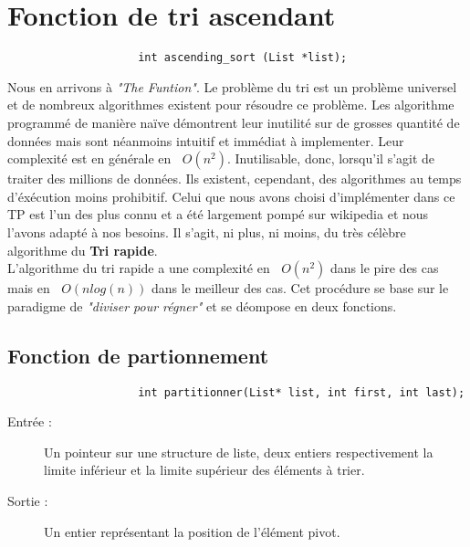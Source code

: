 \documentclass[a4paper, 12pt, leqno]{report}
\theoremstyle{plain}
\newcommand{\bigO}[1]{\ensuremath{\mathop{}\mathopen{}O\mathopen{}\left(#1\right)}}
\begin{document}
        \section{Fonction de tri ascendant}
                        \begin{verbatim}
                    int ascending_sort (List *list);
                \end{verbatim}
            Nous en arrivons à \textit{"The Funtion"}. Le problème du tri est un problème universel et de nombreux algorithmes existent pour résoudre ce problème. Les algorithme programmé de manière naïve démontrent leur inutilité sur de grosses quantité de données mais sont néanmoins intuitif et immédiat à implementer. Leur complexité est en générale en $\bigO{n^2}$. Inutilisable, donc, lorsqu'il s'agit de traiter des millions de données. Ils existent, cependant, des algorithmes au temps d'éxécution moins prohibitif. Celui que nous avons choisi d'implémenter dans ce TP est l'un des plus connu et a été largement pompé sur wikipedia et nous l'avons adapté à nos besoins. Il s'agit, ni plus, ni moins, du très célèbre algorithme du \textbf{Tri rapide}.\\
            
            L'algorithme du tri rapide a une complexité en $\bigO{n^2}$ dans le pire des cas mais en $\bigO{nlog(n)}$ dans le meilleur des cas. Cet procédure se base sur le paradigme de \textit{"diviser pour régner"} et se déompose en deux fonctions.
                      
            
            \subsection{Fonction de partionnement}
                \begin{verbatim}
                    int partitionner(List* list, int first, int last);
                \end{verbatim}
                \begin{description}
                    \item[Entrée :] Un pointeur sur une structure de liste, deux entiers respectivement la limite inférieur et la limite supérieur des éléments à trier.
                    \item[Sortie :] Un entier représentant la position de l'élément pivot.
                \end{description}
                
                \newpage
                
\end{document}
